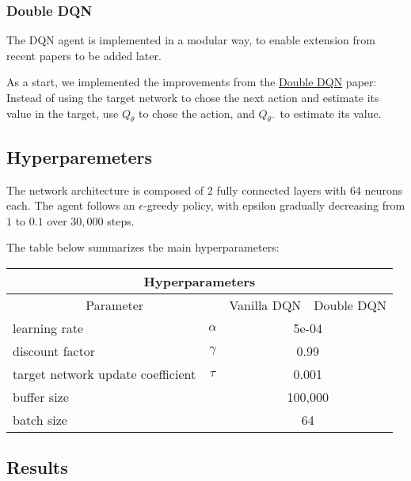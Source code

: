 \documentclass{article}
\begin{document}
    \subsubsection{Double DQN}

    The DQN agent is implemented in a modular way, to enable extension from recent papers to be added later.

    As a start, we implemented the improvements from the \href{https://arxiv.org/abs/1509.06461}{Double DQN} paper:
    Instead of using the target network to chose the next action and estimate its value in the target, use $Q_\theta$ to chose the action, and $Q_{\theta^-}$ to estimate its value.

    \subsection{Hyperparemeters}

    The network architecture is composed of 2 fully connected layers with 64 neurons each.
    The agent follows an $\epsilon$-greedy policy, with epsilon gradually decreasing from $1$ to $0.1$ over $30,000$ steps.

    The table below summarizes the main hyperparameters:

    \begin{tabular}{ |p{5cm} c{1cm}|c{3cm}|c{3cm}| }
        \hline
        \multicolumn{4}{|c|}{Hyperparameters} \\
        \hline
        \multicolumn{2}{|c|}{Parameter}   & Vanilla DQN & Double DQN                    \\
        \hline
        learning rate                     & $\alpha$    & \multicolumn{2}{|c|}{5e-04}   \\
        \hline
        discount factor                   & $\gamma$    & \multicolumn{2}{|c|}{0.99}    \\
        \hline
        target network update coefficient & $\tau$      & \multicolumn{2}{|c|}{0.001}   \\
        \hline
        buffer size                       &             & \multicolumn{2}{|c|}{100,000} \\
        \hline
        batch size                        &             & \multicolumn{2}{|c|}{64}      \\
        \hline
    \end{tabular}

    \subsection{Results}
\end{document}

